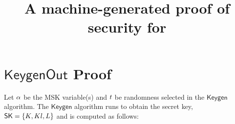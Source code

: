 \documentclass[11pt]{article}
\begin{document}

%

\newtheorem{definition}{Definition}
\newtheorem{theorem}{Theorem}
\newcommand{\Oracle}{\mathcal{O}}
\newcommand{\Adv}{\mathcal{A}}
\newcommand{\Bdv}{\mathcal{B}}
\newcommand{\MS}{\mathcal{M}}
\newcommand{\Psetup}{\mathsf{PSetup}}
\newcommand{\Msetup}{\mathsf{Setup}}
\newcommand{\params}{\mathit{params}}
\newcommand{\brk}[1]{\langle #1 \rangle}
\newcommand{\ait}[1]{#1}
\newcommand{\Ga}{\ait{\mathbb{G}}_1}
\newcommand{\ga}{\ait{g}_1}
\newcommand{\ha}{\ait{h}_1}
\newcommand{\poly}{\mathrm{poly}}

\newcommand{\bit}[1]{#1}
\newcommand{\Gb}{\bit{\mathbb{G}}_2}
\newcommand{\gb}{\bit{g}_2}
\newcommand{\hb}{\bit{h}_2}

\newcommand{\cit}[1]{#1}
\newcommand{\Gc}{\cit{\Group_T}}
\newcommand{\gc}{\cit{g}}
\newcommand{\hc}{\cit{h}}
\newcommand{\Zp}{\mathbb{Z}_p}

\newcommand{\Group}{\ensuremath{\mathbb{G}}\xspace}
\newcommand{\Hroup}{\ensuremath{\mathbb{H}}\xspace}
\newcommand{\map}{\mathbf{e}}

\newcommand{\prot}{\mathsf{Prot}}
\newcommand{\auxext}{\mathit{auxext}}
\newcommand{\auxsim}{\mathit{auxsim}}
\newcommand{\aux}{\mathit{aux}}
\newcommand{\state}{\mathit{state}}
\newcommand{\Alg}{\mathsf{Alg}}
\newcommand{\A}{\mathcal{A}}

\newcommand{\Sig}{\mathsf{Sig}}
\newcommand{\G}{\mathsf{Gen}}
\newcommand{\SK}{\mathsf{SK}}
\newcommand{\CT}{\mathsf{CT}}
\newcommand{\Screen}{\mathsf{Screen}}
\newcommand{\Setup}{\mathsf{Setup}}
\newcommand{\Keygen}{\mathsf{Keygen}}
\newcommand{\KeygenOut}{\mathsf{KeygenOut}}
\newcommand{\Transform}{\mathsf{Transform}}
\newcommand{\Decrypt}{\mathsf{Decrypt}}
\newcommand{\Decout}{\mathsf{DecOut}}
\newcommand{\compareequals}{\stackrel{?}{=}}
\newcommand{\numsigs}{\eta}

\title{A machine-generated proof of security for {\schemename}}
\author{}
\date{}
\maketitle

\section{$\KeygenOut$ Proof}

Let $\alpha$ be the MSK variable(s) and $t$ be randomness selected in the $\Keygen$ algorithm. The $\Keygen$ algorithm runs to obtain the secret key, \\ $\SK = \{\secretkey\}$ and is computed as follows:
\end{document}
